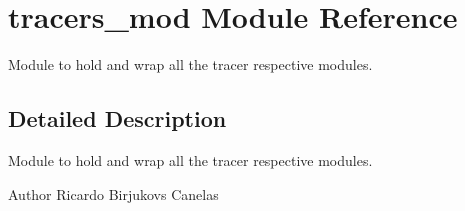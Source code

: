 \hypertarget{namespacetracers__mod}{}\section{tracers\+\_\+mod Module Reference}
\label{namespacetracers__mod}


Module to hold and \textquotesingle{}wrap\textquotesingle{} all the tracer respective modules.  




\subsection{Detailed Description}
Module to hold and \textquotesingle{}wrap\textquotesingle{} all the tracer respective modules. 

\begin{DoxyAuthor}{Author}
Ricardo Birjukovs Canelas 
\end{DoxyAuthor}
